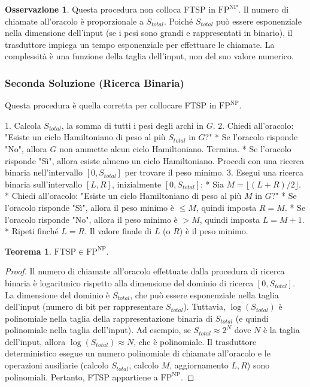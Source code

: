 \documentclass[a4paper]{article}
\theoremstyle{definition} %
\newtheorem{theorem}{Teorema}
\newtheorem{remark}{Osservazione}
\begin{document}
\begin{remark}
Questa procedura non colloca FTSP in $\text{FP}^{\text{NP}}$. Il numero di chiamate all'oracolo è proporzionale a $S_{total}$. Poiché $S_{total}$ può essere esponenziale nella dimensione dell'input (se i pesi sono grandi e rappresentati in binario), il trasduttore impiega un tempo esponenziale per effettuare le chiamate. La complessità è una funzione della taglia dell'input, non del suo valore numerico.
\end{remark}

\subsubsection{Seconda Soluzione (Ricerca Binaria)}
Questa procedura è quella corretta per collocare FTSP in $\text{FP}^{\text{NP}}$.

1.  Calcola $S_{total}$, la somma di tutti i pesi degli archi in $G$.
2.  Chiedi all'oracolo: "Esiste un ciclo Hamiltoniano di peso al più $S_{total}$ in $G$?"
    *   Se l'oracolo risponde "No", allora $G$ non ammette alcun ciclo Hamiltoniano. Termina.
    *   Se l'oracolo risponde "Sì", allora esiste almeno un ciclo Hamiltoniano. Procedi con una ricerca binaria nell'intervallo $[0, S_{total}]$ per trovare il peso minimo.
3.  Esegui una ricerca binaria sull'intervallo $[L, R]$, inizialmente $[0, S_{total}]$:
    *   Sia $M = \lfloor (L+R)/2 \rfloor$.
    *   Chiedi all'oracolo: "Esiste un ciclo Hamiltoniano di peso al più $M$ in $G$?"
    *   Se l'oracolo risponde "Sì", allora il peso minimo è $\le M$, quindi imposta $R = M$.
    *   Se l'oracolo risponde "No", allora il peso minimo è $> M$, quindi imposta $L = M+1$.
    *   Ripeti finché $L=R$. Il valore finale di $L$ (o $R$) è il peso minimo.

\begin{theorem}
$\text{FTSP} \in \text{FP}^{\text{NP}}$.
\end{theorem}
\begin{proof}
Il numero di chiamate all'oracolo effettuate dalla procedura di ricerca binaria è logaritmico rispetto alla dimensione del dominio di ricerca $[0, S_{total}]$.
La dimensione del dominio è $S_{total}$, che può essere esponenziale nella taglia dell'input (numero di bit per rappresentare $S_{total}$).
Tuttavia, $\log(S_{total})$ è polinomiale nella taglia della rappresentazione binaria di $S_{total}$ (e quindi polinomiale nella taglia dell'input).
Ad esempio, se $S_{total} \approx 2^N$ dove $N$ è la taglia dell'input, allora $\log(S_{total}) \approx N$, che è polinomiale.
Il trasduttore deterministico esegue un numero polinomiale di chiamate all'oracolo e le operazioni ausiliarie (calcolo $S_{total}$, calcolo $M$, aggiornamento $L, R$) sono polinomiali. Pertanto, FTSP appartiene a $\text{FP}^{\text{NP}}$.
\end{proof}
\end{document}
